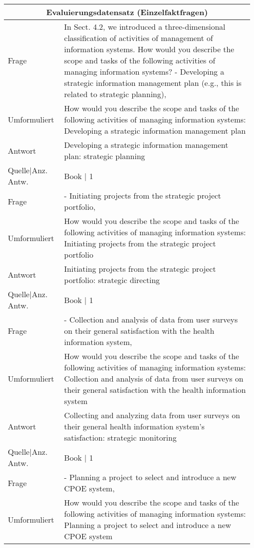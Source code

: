 {\footnotesize
\begin{landscape}
\begin{longtable}{p{3cm}p{}}
    \toprule
    \multicolumn{2}{c}{\textbf{Evaluierungsdatensatz (Einzelfaktfragen)}}\\
    \midrule
    Frage & In Sect. 4.2, we introduced a three-dimensional classification of activities of management of information systems.
    How would you describe the scope and tasks of the following activities of managing information systems? - Developing a strategic information management plan (e.g., this is related to strategic planning), \\
    Umformuliert & How would you describe the scope and tasks of the following activities of managing information systems: Developing a strategic information management plan \\
    Antwort & Developing a strategic information management plan: strategic planning \\
    Quelle|Anz. Antw. & Book | 1\\
    \midrule
    Frage & - Initiating projects from the strategic project portfolio, \\
    Umformuliert & How would you describe the scope and tasks of the following activities of managing information systems: Initiating projects from the strategic project portfolio \\
    Antwort & Initiating projects from the strategic project portfolio: strategic directing \\
    Quelle|Anz. Antw. & Book | 1 \\
    \midrule
    Frage & - Collection and analysis of data from user surveys on their general satisfaction with the health information system, \\
    Umformuliert & How would you describe the scope and tasks of the following activities of managing information systems: Collection and analysis of data from user surveys on their general satisfaction with the health information system \\
    Antwort & Collecting and analyzing data from user surveys on their general health information system's satisfaction: strategic monitoring \\
    Quelle|Anz. Antw. & Book | 1 \\
    \midrule
    Frage & - Planning a project to select and introduce a new CPOE system, \\
    Umformuliert & How would you describe the scope and tasks of the following activities of managing information systems: Planning a project to select and introduce a new CPOE system \\

\end{longtable}
\end{landscape}}
